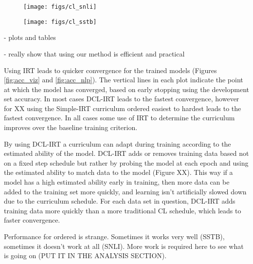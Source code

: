 \documentclass[letterpaper]{article} %
\begin{document}
\captionsetup[subfigure]{labelformat=empty}
\begin{figure*}[th!]
	\centering
	\begin{subfigure}[b]{0.45\textwidth}
		\centering
		\texttt{[image: figs/cl\_snli]}
		\caption{\label{fig:cl_snli}} 
		\vspace{-2em} 
	\end{subfigure} 
	\begin{subfigure}[b]{0.45\textwidth}
		\centering
		\texttt{[image: figs/cl\_sstb]}
		\caption{\label{fig:cl_sstb}} 
		\vspace{-2em} 
	\end{subfigure} 
	
	\caption{Test set accuracy as a function of training epoch.}
	\label{fig:acc_nlp}
\end{figure*}

- plots and tables 

- really show that using our method is efficient and practical 



Using IRT leads to quicker convergence for the trained models (Figures \ref{fig:acc_viz} and \ref{fig:acc_nlp}).
The vertical lines in each plot indicate the point at which the model has converged, based on early stopping using the development set accuracy.
In most cases DCL-IRT leads to the fastest convergence, however for XX using the Simple-IRT curriculum ordered easiest to hardest leads to the fastest convergence.
In all cases some use of IRT to determine the curriculum improves over the baseline training criterion. 

By using DCL-IRT a curriculum can adapt during training according to the estimated ability of the model.
DCL-IRT adds or removes training data based not on a fixed step schedule but rather by probing the model at each epoch and using the estimated ability to match data to the model (Figure XX).
This way if a model has a high estimated ability early in training, then more data can be added to the training set more quickly, and learning isn't artificially slowed down due to the curriculum schedule.
For each data set in question, DCL-IRT adds training data more quickly than a more traditional CL schedule, which leads to faster convergence.

Performance for ordered is strange.
Sometimes it works very well (SSTB), sometimes it doesn't work at all (SNLI).
More work is required here to see what is going on (PUT IT IN THE ANALYSIS SECTION).
\end{document}
